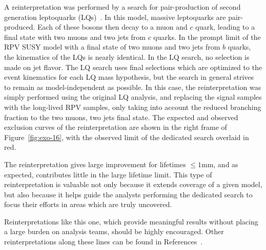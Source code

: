 A reinterpretation was performed by a search for pair-production of second
generation leptoquarks (LQs)~\cite{CMS-PAS-EXO-16-007}. In this model, massive
leptoquarks are pair-produced.  Each of these bosons then decay to a muon and
$c$ quark, leading to a final state with two muons and two jets from $c$ quarks.
In the prompt limit of the RPV SUSY model with a final state of two muons and
two jets from $b$ quarks, the kinematics of the LQs is nearly identical. In the
LQ search, no selection is made on jet flavor. The LQ search uses final
selections which are optimized to the event kinematics for each LQ mass
hypothesis, but the search in general strives to remain as model-independent as
possible. In this case, the reinterpretation was simply performed using the
original LQ analysis, and replacing the signal samples with the long-lived RPV
samples, only taking into account the reduced branching fraction to the two
muons, two jets final state. The expected and observed exclusion curves of the
reinterpretation are shown in the right frame of Figure~\ref{fig:exo-16}, with
the observed limit of the dedicated search overlaid in red.

The reinterpretation gives large improvement for lifetimes $\leq1$mm, and as
expected, contributes little in the large lifetime limit. This type of
reinterpretation is valuable not only because it extends coverage of a given
model, but also because it helps guide the analysts performing the dedicated
search to focus their efforts in areas which are truly uncovered.

Reinterpretations like this one, which provide meaningful results without
placing a large burden on analysis teams, should be highly encouraged. Other reinterpretations along 
these lines can be found in References~\cite{ATLAS-CONF-2014-037,ATLAS-CONF-2018-003}. 

